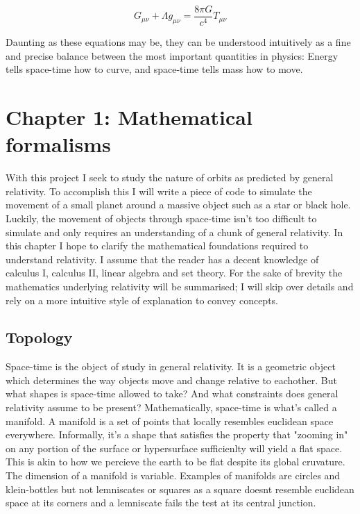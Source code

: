 \documentclass{article}
\begin{document}
  \begin{equation*}
   G_{\mu \nu} + \Lambda g_{\mu \nu} = \frac{8 \pi G}{c^4} T_{\mu \nu}
  \end{equation*}  
  
  Daunting as these equations may be, they can be understood intuitively as a fine and precise balance between the most important quantities in physics: Energy tells space-time how to curve, and space-time tells mass how to move.
  
  \newpage
  \tableofcontents

  \newpage
  \section{Chapter 1: Mathematical formalisms}

  With this project I seek to study the nature of orbits as predicted by general relativity. To accomplish this I will write a piece of code to simulate the movement of a small planet around a massive object such as a star or black hole. Luckily, the movement of objects through space-time isn't too difficult to simulate and only requires an understanding of a chunk of general relativity. In this chapter I hope to clarify the mathematical foundations required to understand relativity. I assume that the reader has a decent knowledge of calculus I, calculus II, linear algebra and set theory. For the sake of brevity the mathematics underlying relativity will be summarised; I will skip over details and rely on a more intuitive style of explanation to convey concepts.

  \subsection{Topology}

  Space-time is the object of study in general relativity. It is a geometric object which determines the way objects move and change relative to eachother. But what shapes is space-time allowed to take? And what constraints does general relativity assume to be present? Mathematically, space-time is what's called a manifold. A manifold is a set of points that locally resembles euclidean space everywhere. Informally, it's a shape that satisfies the property that "zooming in" on any portion of the surface or hypersurface sufficienlty will yield a flat space. This is akin to how we percieve the earth to be flat despite its global cruvature. The dimension of a manifold is variable. Examples of manifolds are circles and klein-bottles but not lemniscates or squares as a square doesnt resemble euclidean space at its corners and a lemniscate fails the test at its central junction.
\end{document}
